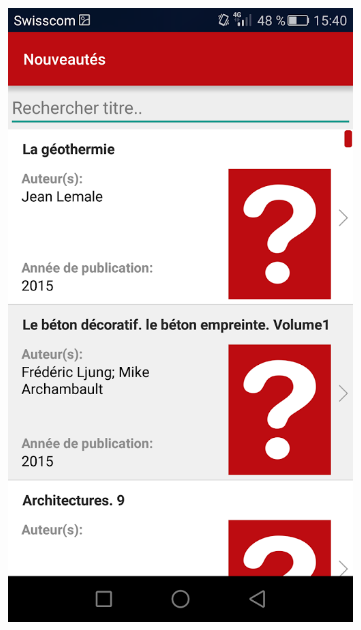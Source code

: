 \documentclass[10pt]{beamer}
\begin{document}
\begin{frame}
\begin{columns}[T]
\begin{column}{.65\textwidth}
\begin{columns}[T]
\begin{column}{.3\textwidth}
\begin{figure}
                    \end{figure}
                \end{column}
                \begin{column}{.3\textwidth}
                    \begin{figure}
                        \includegraphics[width=1\textwidth]{images/unnamed2.png}
                    \end{figure}
                \end{column}

\end{columns}
\end{column}
\end{columns}
\end{frame}
\end{document}
